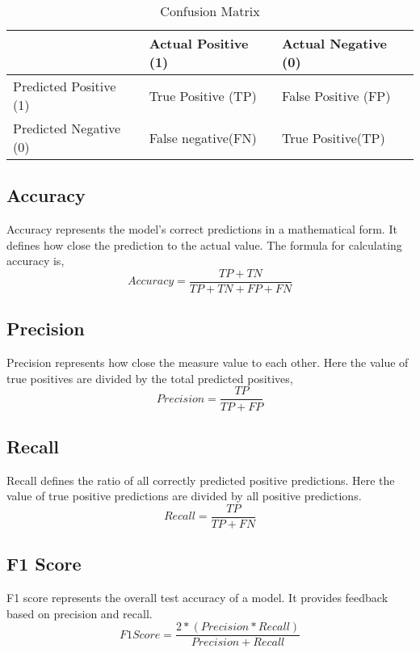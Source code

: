 \begin{table}[h!]
\centering
\begin{tabular}{|l|l|l|}
\hline
& Actual Positive (1) & Actual Negative (0)\\
\hline
Predicted Positive (1) & True Positive (TP) & False Positive (FP)  \\
\hline
Predicted Negative (0) & False negative(FN) & True Positive(TP) \\
\hline
\end{tabular}
\caption{Confusion Matrix}
\end{table}

\subsection{Accuracy}
Accuracy represents the model's correct predictions in a mathematical form. It defines how close the prediction to the actual value.
The formula for calculating accuracy is,
\begin{equation}
Accuracy = {\frac{TP+TN}{TP+TN+FP+FN}}
\end{equation}

\subsection{Precision}
Precision represents how close the measure value to each other. Here the value of true positives are divided by the total predicted positives,
\begin{equation}
Precision = {\frac{TP}{TP+FP}}
\end{equation}

\subsection{Recall}
Recall defines the ratio of all correctly predicted positive predictions. Here the value of true positive predictions are divided by all positive predictions.
\begin{equation}
Recall = {\frac{TP}{TP+FN}}
\end{equation}

\subsection{F1 Score}
F1 score represents the overall test accuracy of a model. It provides feedback based on precision and recall.
\begin{equation}
F1 Score = {\frac{2*(Precision*Recall)}{Precision+Recall}}
\end{equation}

